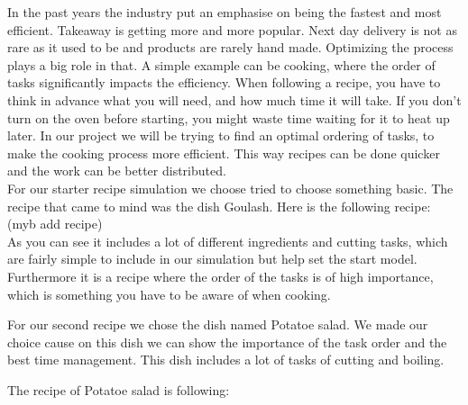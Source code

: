 
In the past years the industry put an emphasise on being the fastest and most efficient. Takeaway is getting more and more popular. Next day delivery is not as rare as it used to be and products are rarely hand made. 
Optimizing the process plays a big role in that. A simple example can be cooking, where the order of tasks significantly impacts the efficiency. When following a recipe, you have to think in advance what you will need, and how much time it will take. If you don't turn on the oven before starting, you might waste time waiting for it to heat up later. In our project we will be trying to find an optimal ordering of tasks, to make the cooking process more efficient. This way recipes can be done quicker and the work can be better distributed. \\

For our starter recipe simulation we choose tried to choose something basic. The recipe that came to mind was the dish Goulash. Here is the following recipe:
\\
(myb add recipe)
\\

As you can see it includes a lot of different ingredients and cutting tasks, which are fairly simple to include in our simulation but help set the start model. Furthermore it is a recipe where the order of the tasks is of high importance, which is something you have to be aware of when cooking. 

For our second recipe we chose the dish named Potatoe salad. We made our choice cause on this dish we can show the importance of the task order and the best time management. This dish includes a lot of tasks of cutting and boiling. 

The recipe of Potatoe salad is following:

